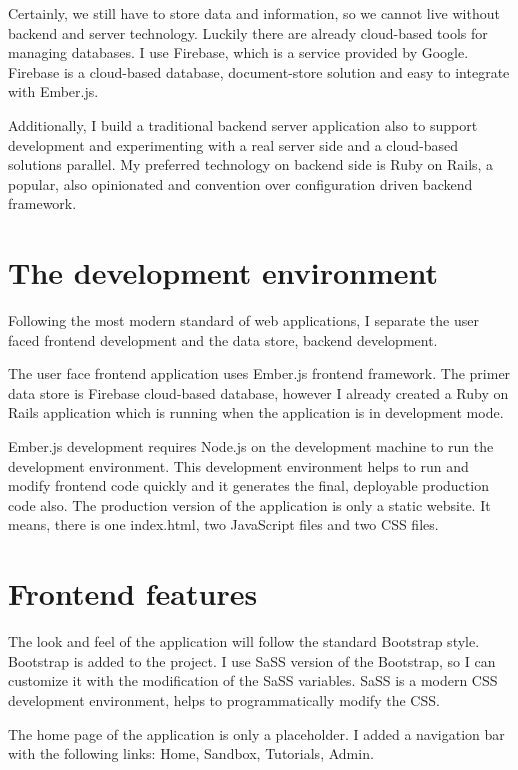 \documentclass[11pt, a4paper, twoside, openright]{report}
\begin{document}
Certainly, we still have to store data and information, so we cannot live without backend and server technology. Luckily there are already cloud-based tools for managing databases. I use Firebase, which is a service provided by Google. Firebase is a cloud-based database, document-store solution and easy to integrate with Ember.js.

Additionally, I build a traditional backend server application also to support development and experimenting with a real server side and a cloud-based solutions parallel. My preferred technology on backend side is Ruby on Rails, a popular, also opinionated and convention over configuration driven backend framework.


\section{The development environment}

Following the most modern standard of web applications, I separate the user faced frontend development and the data store, backend development.

The user face frontend application uses Ember.js frontend framework. The primer data store is Firebase cloud-based database, however I already created a Ruby on Rails application which is running when the application is in development mode.

Ember.js development requires Node.js on the development machine to run the development environment. This development environment helps to run and modify frontend code quickly and it generates the final, deployable production code also. The production version of the application is only a static website. It means, there is one index.html, two JavaScript files and two CSS files.

\section{Frontend features}

The look and feel of the application will follow the standard Bootstrap style. Bootstrap is added to the project. I use SaSS version of the Bootstrap, so I can customize it with the modification of the SaSS variables. SaSS is a modern CSS development environment, helps to programmatically modify the CSS.

The home page of the application is only a placeholder. I added a navigation bar with the following links: Home, Sandbox, Tutorials, Admin.
\end{document}
